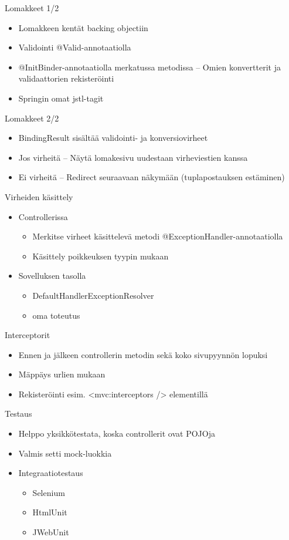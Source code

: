 \documentclass[hyperref={pdfauthor=\AUTHOR},14pt]{beamer}
\begin{document}
\begin{frame}[t, fragile]{Lomakkeet 1/2}
\begin{itemize}
\item Lomakkeen kentät backing objectiin
\item Validointi @Valid-annotaatiolla
\item @InitBinder-annotaatiolla merkatussa metodissa
-- Omien konvertterit ja validaattorien rekisteröinti
\item Springin omat jstl-tagit
\end{itemize}
\end{frame}

\begin{frame}[t, fragile]{Lomakkeet 2/2}
\begin{itemize}
\item BindingResult sisältää validointi- ja konversiovirheet
\item Jos virheitä
-- Näytä lomakesivu uudestaan virheviestien kanssa
\item Ei virheitä 
-- Redirect seuraavaan näkymään (tuplapostauksen estäminen)
\end{itemize}
\end{frame}

\begin{frame}[t, fragile]{Virheiden käsittely}
\begin{itemize}
\item Controllerissa
\begin{itemize}
\item Merkitse virheet käsittelevä metodi @ExceptionHandler-annotaatiolla
\item Käsittely poikkeuksen tyypin mukaan
\end{itemize}
\item Sovelluksen tasolla
\begin{itemize}
\item DefaultHandlerExceptionResolver 
\item oma toteutus
\end{itemize}
\end{itemize}
\end{frame}

\begin{frame}[t, fragile]{Interceptorit}
\begin{itemize}
\item Ennen ja jälkeen controllerin metodin sekä koko sivupyynnön lopuksi
\item Mäppäys urlien mukaan
\item Rekisteröinti esim. <mvc:interceptors /> elementillä
\end{itemize}
\end{frame}

\begin{frame}[t, fragile]{Testaus}
\begin{itemize}
\item Helppo yksikkötestata, koska controllerit ovat POJOja
\item Valmis setti mock-luokkia
\item Integraatiotestaus
\begin{itemize}
\item Selenium
\item HtmlUnit
\item JWebUnit
\end{itemize}
\end{itemize}
\end{frame}
\end{document}
